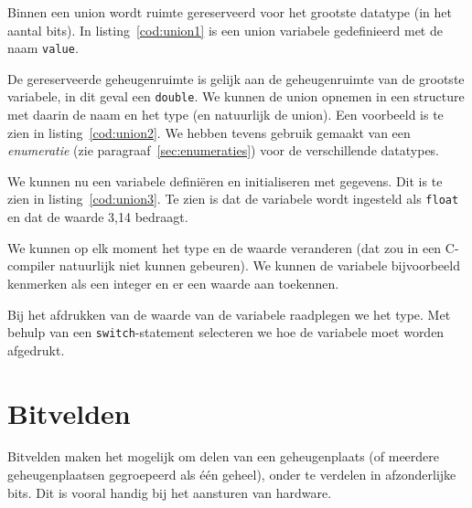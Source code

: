 Binnen een union wordt ruimte gereserveerd voor het grootste datatype (in het aantal bits). In listing~\ref{cod:union1} is een union variabele gedefinieerd met de naam \texttt{value}.


De gereserveerde geheugenruimte is gelijk aan de geheugenruimte van de grootste variabele, in dit geval een \texttt{double}. We kunnen de union opnemen in een structure met daarin de naam en het type (en natuurlijk de union). Een voorbeeld is te zien in listing~\ref{cod:union2}. We hebben tevens gebruik gemaakt van een \textsl{enumeratie} (zie paragraaf~\ref{sec:enumeraties}) voor de verschillende datatypes.


We kunnen nu een variabele definiëren en initialiseren met gegevens. Dit is te zien in listing~\ref{cod:union3}. Te zien is dat de variabele wordt ingesteld als \texttt{float} en dat de waarde 3,14 bedraagt.


We kunnen op elk moment het type en de waarde veranderen (dat zou in een C-compiler natuurlijk niet kunnen gebeuren). We kunnen de variabele bijvoorbeeld kenmerken als een integer en er een waarde aan toekennen.


Bij het afdrukken van de waarde van de variabele raadplegen we het type. Met behulp van een \texttt{switch}-statement selecteren we hoe de variabele moet worden afgedrukt.


\section{Bitvelden}
Bitvelden maken het mogelijk om delen van een geheugenplaats (of meerdere geheugenplaatsen gegroepeerd als één geheel), onder te verdelen in afzonderlijke bits. Dit is vooral handig bij het aansturen van hardware.

